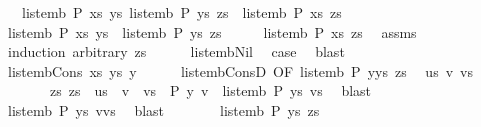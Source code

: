 \begin{isabellebody}
\ \ \ {\isachardoublequoteopen}{\isasymlbrakk}list{\isacharunderscore}emb\ P\ xs\ ys{\isacharsemicolon}\ list{\isacharunderscore}emb\ P\ ys\ zs{\isasymrbrakk}\ {\isasymLongrightarrow}\ list{\isacharunderscore}emb\ P\ xs\ zs{\isachardoublequoteclose}\isanewline
%
\isadelimproof
%
\endisadelimproof
%
\isatagproof
{}\isamarkupfalse%
\ {\isacharminus}\isanewline
\ \ \isamarkupfalse%
\ {\isachardoublequoteopen}list{\isacharunderscore}emb\ P\ xs\ ys{\isachardoublequoteclose}\ \ {\isachardoublequoteopen}list{\isacharunderscore}emb\ P\ ys\ zs{\isachardoublequoteclose}\isanewline
\ \ \isamarkupfalse%
\ \isamarkupfalse%
\ {\isachardoublequoteopen}list{\isacharunderscore}emb\ P\ xs\ zs{\isachardoublequoteclose}\ \isamarkupfalse%
\ assms\isanewline
\ \ \isamarkupfalse%
\ {\isacharparenleft}induction\ arbitrary{\isacharcolon}\ zs{\isacharparenright}\isanewline
\ \ \ \ \isamarkupfalse%
\ list{\isacharunderscore}emb{\isacharunderscore}Nil\ \isamarkupfalse%
\ {\isacharquery}case\ \isamarkupfalse%
\ blast\isanewline
\ \ \isamarkupfalse%
\isanewline
\ \ \ \ \isamarkupfalse%
\ {\isacharparenleft}list{\isacharunderscore}emb{\isacharunderscore}Cons\ xs\ ys\ y{\isacharparenright}\isanewline
\ \ \ \ \isamarkupfalse%
\ list{\isacharunderscore}emb{\isacharunderscore}ConsD\ {\isacharbrackleft}OF\ {\isacartoucheopen}list{\isacharunderscore}emb\ P\ {\isacharparenleft}y{\isacharhash}ys{\isacharparenright}\ zs{\isacartoucheclose}{\isacharbrackright}\ \isamarkupfalse%
\ us\ v\ vs\isanewline
\ \ \ \ \ \ \ zs{\isacharcolon}\ {\isachardoublequoteopen}zs\ {\isacharequal}\ us\ {\isacharat}\ v\ {\isacharhash}\ vs{\isachardoublequoteclose}\ \ {\isachardoublequoteopen}P\isactrlsup {\isacharequal}\isactrlsup {\isacharequal}\ y\ v{\isachardoublequoteclose}\ \ {\isachardoublequoteopen}list{\isacharunderscore}emb\ P\ ys\ vs{\isachardoublequoteclose}\ \isamarkupfalse%
\ blast\isanewline
\ \ \ \ \isamarkupfalse%
\ \isamarkupfalse%
\ {\isachardoublequoteopen}list{\isacharunderscore}emb\ P\ ys\ {\isacharparenleft}v{\isacharhash}vs{\isacharparenright}{\isachardoublequoteclose}\ \isamarkupfalse%
\ blast\isanewline
\ \ \ \ \isamarkupfalse%
\ \isamarkupfalse%
\ {\isachardoublequoteopen}list{\isacharunderscore}emb\ P\ ys\ zs{\isachardoublequoteclose}\ \isamarkupfalse%

\end{isabellebody}

